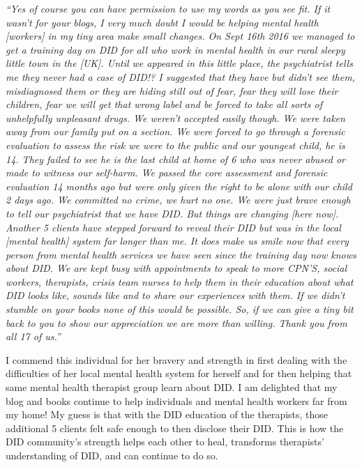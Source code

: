 \documentclass[]{book}
\begin{document}
\emph{``Yes of course you can have permission to use my words as you see fit. If it wasn't for your blogs, I very much doubt I would be helping mental health {[}workers{]} in my tiny area make small changes. On Sept 16th 2016 we managed to get a training day on DID for all who work in mental health in our rural sleepy little town in the {[}UK{]}. Until we appeared in this little place, the psychiatrist tells me they never had a case of DID!? I suggested that they have but didn't see them, misdiagnosed them or they are hiding still out of fear, fear they will lose their children, fear we will get that wrong label and be forced to take all sorts of unhelpfully unpleasant drugs. We weren't accepted easily though. We were taken away from our family put on a section. We were forced to go through a forensic evaluation to assess the risk we were to the public and our youngest child, he is 14. They failed to see he is the last child at home of 6 who was never abused or made to witness our self-harm. We passed the core assessment and forensic evaluation 14 months ago but were only given the right to be alone with our child 2 days ago. We committed no crime, we hurt no one. We were just brave enough to tell our psychiatrist that we have DID. But things are changing {[}here now{]}. Another 5 clients have stepped forward to reveal their DID but was in the local {[}mental health{]} system far longer than me. It does make us smile now that every person from mental health services we have seen since the training day now knows about DID. We are kept busy with appointments to speak to more CPN'S, social workers, therapists, crisis team nurses to help them in their education about what DID looks like, sounds like and to share our experiences with them. If we didn't stumble on your books none of this would be possible. So, if we can give a tiny bit back to you to show our appreciation we are more than willing. Thank you from all 17 of us.''}

I commend this individual for her bravery and strength in first dealing with the difficulties of her local mental health system for herself and for then helping that same mental health therapist group learn about DID. I am delighted that my blog and books continue to help individuals and mental health workers far from my home! My guess is that with the DID education of the therapists, those additional 5 clients felt safe enough to then disclose their DID. This is how the DID community's strength helps each other to heal, transforms therapists' understanding of DID, and can continue to do so.
\end{document}
